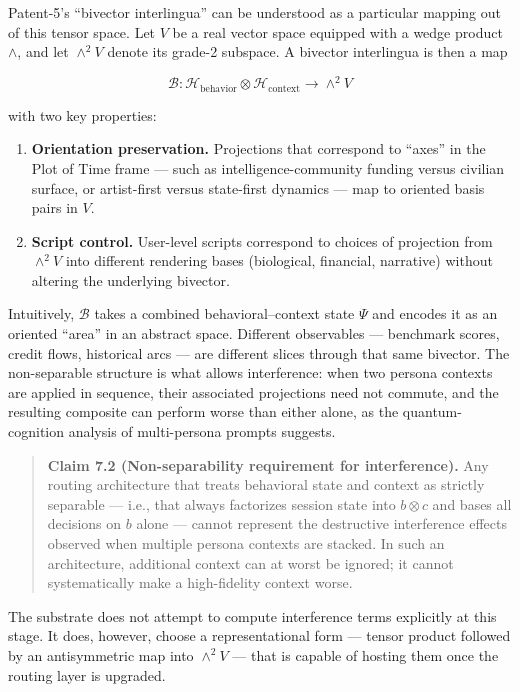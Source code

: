 \documentclass{article}
\providecommand{\tightlist}{\setlength{\itemsep}{0pt}\setlength{\parskip}{0pt}}
\begin{document}
Patent-5's ``bivector interlingua'' can be understood as a particular
mapping out of this tensor space. Let \(V\) be a real vector space
equipped with a wedge product \(\wedge\), and let \(\wedge^2 V\) denote
its grade-2 subspace. A bivector interlingua is then a map

\[
\mathcal{B} : \mathcal{H}_{\text{behavior}} \otimes \mathcal{H}_{\text{context}} \to \wedge^2 V
\]

with two key properties:

\begin{enumerate}
\def\labelenumi{\arabic{enumi}.}
\tightlist
\item
  \textbf{Orientation preservation.} Projections that correspond to
  ``axes'' in the Plot of Time frame --- such as intelligence-community
  funding versus civilian surface, or artist-first versus state-first
  dynamics --- map to oriented basis pairs in \(V\).
\item
  \textbf{Script control.} User-level scripts correspond to choices of
  projection from \(\wedge^2 V\) into different rendering bases
  (biological, financial, narrative) without altering the underlying
  bivector.
\end{enumerate}

Intuitively, \(\mathcal{B}\) takes a combined behavioral--context state
\(\Psi\) and encodes it as an oriented ``area'' in an abstract space.
Different observables --- benchmark scores, credit flows, historical
arcs --- are different slices through that same bivector. The
non-separable structure is what allows interference: when two persona
contexts are applied in sequence, their associated projections need not
commute, and the resulting composite can perform worse than either
alone, as the quantum-cognition analysis of multi-persona prompts
suggests.

\begin{quote}
\textbf{Claim 7.2 (Non-separability requirement for interference).} Any
routing architecture that treats behavioral state and context as
strictly separable --- i.e., that always factorizes session state into
\(b \otimes c\) and bases all decisions on \(b\) alone --- cannot
represent the destructive interference effects observed when multiple
persona contexts are stacked. In such an architecture, additional
context can at worst be ignored; it cannot systematically make a
high-fidelity context worse.
\end{quote}

The substrate does not attempt to compute interference terms explicitly
at this stage. It does, however, choose a representational form ---
tensor product followed by an antisymmetric map into \(\wedge^2 V\) ---
that is capable of hosting them once the routing layer is upgraded.
\end{document}
